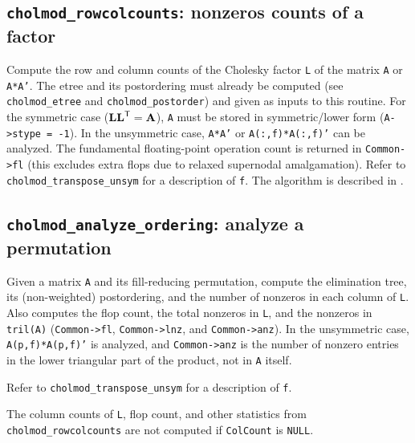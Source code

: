 \documentclass[11pt]{article}
\newcommand{\m}[1]{{\bf{#1}}}       %
\newcommand{\tr}{^{\sf T}}          %
\begin{document}
\subsection{{\tt cholmod\_rowcolcounts}: nonzeros counts of a factor}


Compute the row and column counts of the Cholesky factor {\tt L} of the matrix
{\tt A} or {\tt A*A'}.  The etree and its postordering must already be computed (see
{\tt cholmod\_etree} and {\tt cholmod\_postorder}) and given as inputs to this routine.
For the symmetric case ($\m{LL}\tr=\m{A}$), {\tt A} must be stored in
symmetric/lower form ({\tt A->stype = -1}).
In the unsymmetric case, {\tt A*A'} or {\tt A(:,f)*A(:,f)'} can be analyzed.
The fundamental floating-point operation count is returned in {\tt Common->fl}
(this excludes extra flops due to relaxed supernodal amalgamation).
Refer to {\tt cholmod\_transpose\_unsym} for a description of {\tt f}.
The algorithm is described in \cite{GilbertLiNgPeyton01,GilbertNgPeyton94}.

% 

\newpage \subsection{{\tt cholmod\_analyze\_ordering}: analyze a permutation}


Given a matrix {\tt A} and its fill-reducing permutation, compute the elimination
tree, its (non-weighted) postordering, and the number of nonzeros in each
column of {\tt L}.  Also computes the flop count, the total nonzeros in {\tt L}, and
the nonzeros in {\tt tril(A)} ({\tt Common->fl}, {\tt Common->lnz}, and {\tt Common->anz}).
In the unsymmetric case, {\tt A(p,f)*A(p,f)'} is analyzed, and {\tt Common->anz}
is the number of nonzero entries in the lower triangular part of the product,
not in {\tt A} itself.

Refer to {\tt cholmod\_transpose\_unsym} for a description of {\tt f}.

The column counts of {\tt L}, flop count, and other statistics from
{\tt cholmod\_rowcolcounts} are not computed if {\tt ColCount} is {\tt NULL}.
\end{document}
